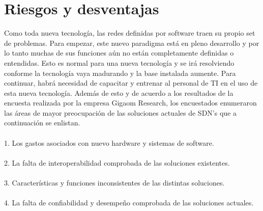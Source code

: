 \documentclass[12pt]{report}
\begin{document}
\section{Riesgos y desventajas}
{
Como toda nueva tecnología, las redes definidas por software traen su propio set de problemas. Para
empezar, este nuevo paradigma está en pleno desarrollo y por lo tanto muchas de sus funciones aún no están
completamente definidas o entendidas. Esto es normal para una nueva tecnología y se irá resolviendo conforme
la tecnología vaya madurando y la base instalada aumente. Para continuar, habrá necesidad de capacitar y
entrenar al personal de TI en el uso de esta nueva tecnología. Además de esto y de acuerdo a los resultados de la
encuesta realizada por la empresa Gigaom Research, los encuestados enumeraron las áreas de mayor
preocupación de las soluciones actuales de SDN’s que a continuación se enlistan.\\\\
1. Los gastos asociados con nuevo hardware y sistemas de software.\\\\
2. La falta de interoperabilidad comprobada de las soluciones existentes.\\\\
3. Características y funciones inconsistentes de las distintas soluciones.\\\\
4. La falta de confiabilidad y desempeño comprobada de las soluciones actuales.\\\\
}
\end{document}
